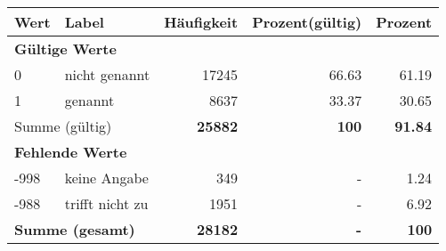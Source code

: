      \begin{longtable}{lXrrr}
     \toprule
     \textbf{Wert} & \textbf{Label} & \textbf{Häufigkeit} & \textbf{Prozent(gültig)} & \textbf{Prozent} \\
     \endhead
     \midrule
     \multicolumn{5}{l}{\textbf{Gültige Werte}}\\

     0 &
     \multicolumn{1}{X}{ nicht genannt   } &


       \num{17245} &
       \num[round-mode=places,round-precision=2]{66.63} &
         \num[round-mode=places,round-precision=2]{61.19} \\

     1 &
     \multicolumn{1}{X}{ genannt   } &


       \num{8637} &
       \num[round-mode=places,round-precision=2]{33.37} &
         \num[round-mode=places,round-precision=2]{30.65} \\
     \midrule
     \multicolumn{2}{l}{Summe (gültig)} &
       \textbf{\num{25882}} &
     \textbf{100} &
       \textbf{\num[round-mode=places,round-precision=2]{91.84}} \\
     \multicolumn{5}{l}{\textbf{Fehlende Werte}}\\
       -998 &
       keine Angabe &
         \num{349} &
        - &
         \num[round-mode=places,round-precision=2]{1.24} \\
       -988 &
       trifft nicht zu &
         \num{1951} &
        - &
         \num[round-mode=places,round-precision=2]{6.92} \\
     \midrule
     \multicolumn{2}{l}{\textbf{Summe (gesamt)}} &
          \textbf{\num{28182}} &
        \textbf{-} &
        \textbf{100} \\
     \bottomrule
     \end{longtable}
     
